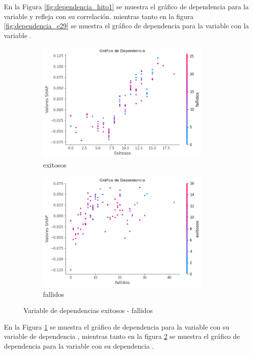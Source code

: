 En la Figura \ref{fig:dependencia_hito1} se muestra el gráfico de dependencia para la variable  y refleja  con su correlación. mientras tanto en la figura \ref{fig:dependencia_e29} se muestra el gráfico de dependencia para la variable  con la variable .

\begin{figure}[H]

    \begin{subfigure}{0.5\textwidth}
        \includegraphics[width=0.9\linewidth, height=6cm]{img/shap_rf/exitosos.png}
        \caption{exitosos}
        \label{fig:dependencia_exitosos}
    \end{subfigure}
    \begin{subfigure}{0.5\textwidth}
        \includegraphics[width=0.9\linewidth, height=6cm]{img/shap_rf/fallidos.png}
        \caption{fallidos}
        \label{fig:dependencia_fallidos}
    \end{subfigure}

    \caption{Variable de dependencias exitosos - fallidos}
    \label{fig:image2}
\end{figure}

En la Figura \ref{fig:dependencia_exitosos} se muestra el gráfico de dependencia para la variable  con su variable de dependencia , mientras tanto en la figura \ref{fig:dependencia_fallidos} se muestra el gráfico de dependencia para la variable  con su dependencia .

